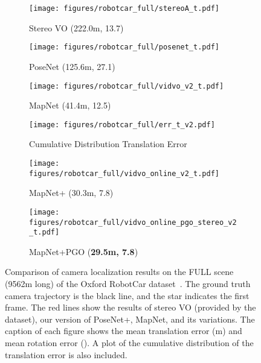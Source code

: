 \begin{figure*}
    \captionsetup[subfigure]{labelformat=empty}
    \centering
    \begin{subfigure}{0.32\linewidth}
        \centering
        \texttt{[image: figures/robotcar\_full/stereoA\_t.pdf]}
        \vspace{-1.5em}
        \caption{\small Stereo VO (222.0m, 13.7\degree)}
    \end{subfigure}
    \hfill
    \begin{subfigure}{0.32\linewidth}
        \centering
        \texttt{[image: figures/robotcar\_full/posenet\_t.pdf]}
        \vspace{-1.5em}
        \caption{\small PoseNet (125.6m, 27.1\degree)}
    \end{subfigure}
    \hfill
    \begin{subfigure}{0.32\linewidth}
        \centering
        \texttt{[image: figures/robotcar\_full/vidvo\_v2\_t.pdf]}
        \vspace{-1.5em}
        \caption{\small MapNet (41.4m, 12.5\degree)}
    \end{subfigure}

    \begin{subfigure}{0.32\linewidth}
        \centering
        \texttt{[image: figures/robotcar\_full/err\_t\_v2.pdf]}
        \vspace{-.5em}
        \caption{\small Cumulative Distribution Translation Error}
    \end{subfigure}
    \hfill
    \begin{subfigure}{0.32\linewidth}
        \centering
        \texttt{[image: figures/robotcar\_full/vidvo\_online\_v2\_t.pdf]}
        \vspace{-1.5em}
        \caption{\small MapNet+ (30.3m, 7.8\degree)}
    \end{subfigure}
    \hfill
    \begin{subfigure}{0.32\linewidth}
        \centering
        \texttt{[image: figures/robotcar\_full/vidvo\_online\_pgo\_stereo\_v2\_t.pdf]}
        \vspace{-1.5em}
        \caption{\small MapNet+PGO ({\bf 29.5m, 7.8\degree})}
    \end{subfigure}
    \vspace{-1em}
    \caption{\small Comparison of camera localization results on the FULL scene (9562m long) of the
    Oxford RobotCar dataset~\cite{RobotCarDatasetIJRR}. The ground truth camera trajectory
    is the black line, and the star indicates the first frame. The red lines show the
    results of stereo VO (provided by the dataset),
    our version of PoseNet+, MapNet, and its variations. The caption
    of each figure shows the mean translation error (m) and mean rotation error (\degree).
    A plot of the cumulative distribution of the translation error is also included.}
    \label{fig:map_compare_robotcar_full}
\end{figure*}

